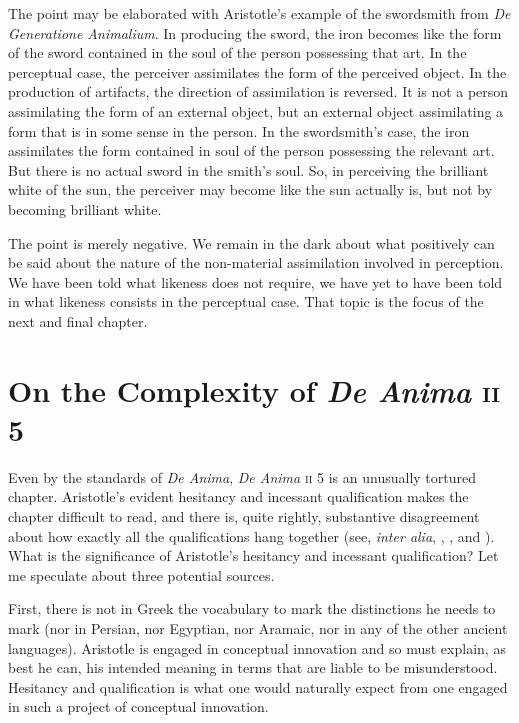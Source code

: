 The point may be elaborated with Aristotle's example of the swordsmith from \emph{De Generatione Animalium}. In producing the sword, the iron becomes like the form of the sword contained in the soul of the person possessing that art. In the perceptual case, the perceiver assimilates the form of the perceived object. In the production of artifacts, the direction of assimilation is reversed. It is not a person assimilating the form of an external object, but an external object assimilating a form that is in some sense in the person. In the swordsmith's case, the iron assimilates the form contained in soul of the person possessing the relevant art. But there is no actual sword in the smith's soul. So, in perceiving the brilliant white of the sun, the perceiver may become like the sun actually is, but not by becoming brilliant white.

The point is merely negative. We remain in the dark about what positively can be said about the nature of the non-material assimilation involved in perception. We have been told what likeness does not require, we have yet to have been told in what likeness consists in the perceptual case. That topic is the focus of the next and final chapter.


\section{On the Complexity of \emph{De Anima} \textsc{ii} 5} %
\label{sec:on_the_complexity_of_de anima_ii_5}

Even by the standards of \emph{De Anima}, \emph{De Anima} \textsc{ii} 5 is an unusually tortured chapter. Aristotle's evident hesitancy and incessant qualification makes the chapter difficult to read, and there is, quite rightly, substantive disagreement about how exactly all the qualifications hang together (see, \emph{inter alia}, \citealt{Burnyeat:2002an}, \citealt{Heinaman:2007ys}, and \citealt{Bowin:2011uq}). What is the significance of Aristotle's hesitancy and incessant qualification? Let me speculate about three potential sources. 

First, there is not in Greek the vocabulary to mark the distinctions he needs to mark (nor in Persian, nor Egyptian, nor Aramaic, nor in any of the other ancient languages). Aristotle is engaged in conceptual innovation and so must explain, as best he can, his intended meaning in terms that are liable to be misunderstood. Hesitancy and qualification is what one would naturally expect from one engaged in such a project of conceptual innovation. 


